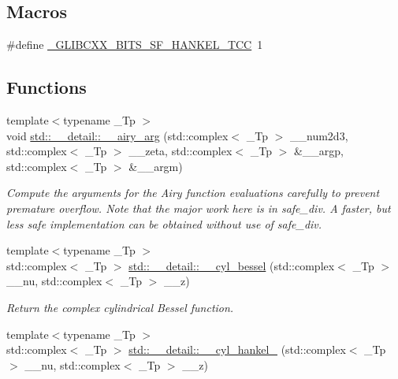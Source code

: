 \subsection*{Macros}
\begin{DoxyCompactItemize}
\item 
\#define \hyperlink{sf__hankel_8tcc_add70af0902438b1aad02be015e5b9375}{\+\_\+\+G\+L\+I\+B\+C\+X\+X\+\_\+\+B\+I\+T\+S\+\_\+\+S\+F\+\_\+\+H\+A\+N\+K\+E\+L\+\_\+\+T\+CC}~1
\end{DoxyCompactItemize}
\subsection*{Functions}
\begin{DoxyCompactItemize}
\item 
{\footnotesize template$<$typename \+\_\+\+Tp $>$ }\\void \hyperlink{namespacestd_1_1____detail_a2473fe60310e9480137e3b66d3944f15}{std\+::\+\_\+\+\_\+detail\+::\+\_\+\+\_\+airy\+\_\+arg} (std\+::complex$<$ \+\_\+\+Tp $>$ \+\_\+\+\_\+num2d3, std\+::complex$<$ \+\_\+\+Tp $>$ \+\_\+\+\_\+zeta, std\+::complex$<$ \+\_\+\+Tp $>$ \&\+\_\+\+\_\+argp, std\+::complex$<$ \+\_\+\+Tp $>$ \&\+\_\+\+\_\+argm)
\begin{DoxyCompactList}\small\item\em Compute the arguments for the Airy function evaluations carefully to prevent premature overflow. Note that the major work here is in {\ttfamily safe\+\_\+div}. A faster, but less safe implementation can be obtained without use of safe\+\_\+div. \end{DoxyCompactList}\item 
{\footnotesize template$<$typename \+\_\+\+Tp $>$ }\\std\+::complex$<$ \+\_\+\+Tp $>$ \hyperlink{namespacestd_1_1____detail_ac4cff6a34fbd90932b47ecdb2445dee2}{std\+::\+\_\+\+\_\+detail\+::\+\_\+\+\_\+cyl\+\_\+bessel} (std\+::complex$<$ \+\_\+\+Tp $>$ \+\_\+\+\_\+nu, std\+::complex$<$ \+\_\+\+Tp $>$ \+\_\+\+\_\+z)
\begin{DoxyCompactList}\small\item\em Return the complex cylindrical Bessel function. \end{DoxyCompactList}\item 
{\footnotesize template$<$typename \+\_\+\+Tp $>$ }\\std\+::complex$<$ \+\_\+\+Tp $>$ \hyperlink{namespacestd_1_1____detail_a9904b6007ef78ef777ac8345f6e47960}{std\+::\+\_\+\+\_\+detail\+::\+\_\+\+\_\+cyl\+\_\+hankel\+\_} (std\+::complex$<$ \+\_\+\+Tp $>$ \+\_\+\+\_\+nu, std\+::complex$<$ \+\_\+\+Tp $>$ \+\_\+\+\_\+z)

\end{DoxyCompactItemize}
